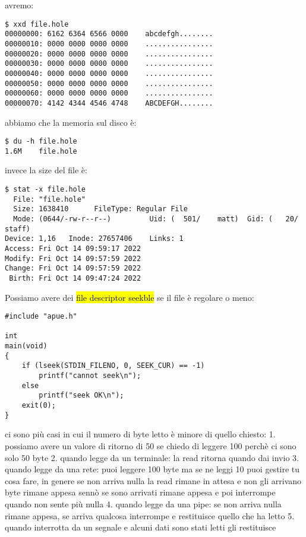 avremo:

\begin{lstlisting}
$ xxd file.hole
00000000: 6162 6364 6566 0000    abcdefgh........
00000010: 0000 0000 0000 0000    ................
00000020: 0000 0000 0000 0000    ................
00000030: 0000 0000 0000 0000    ................
00000040: 0000 0000 0000 0000    ................
00000050: 0000 0000 0000 0000    ................
00000060: 0000 0000 0000 0000    ................
00000070: 4142 4344 4546 4748    ABCDEFGH........
\end{lstlisting}

abbiamo che la memoria sul disco è:

\begin{lstlisting}
$ du -h file.hole 
1.6M	file.hole
\end{lstlisting}

invece la size del file è:

\begin{lstlisting}
$ stat -x file.hole 
  File: "file.hole"
  Size: 1638410      FileType: Regular File
  Mode: (0644/-rw-r--r--)         Uid: (  501/    matt)  Gid: (   20/   staff)
Device: 1,16   Inode: 27657406    Links: 1
Access: Fri Oct 14 09:59:17 2022
Modify: Fri Oct 14 09:57:59 2022
Change: Fri Oct 14 09:57:59 2022
 Birth: Fri Oct 14 09:47:24 2022
\end{lstlisting}

Possiamo avere dei \hl{file descriptor seekble} se il file è regolare o meno:

\begin{lstlisting}
#include "apue.h"

int
main(void)
{
	if (lseek(STDIN_FILENO, 0, SEEK_CUR) == -1)
		printf("cannot seek\n");
	else
		printf("seek OK\n");
	exit(0);
}
\end{lstlisting}






ci sono più casi in cui il numero di byte letto è minore di quello chiesto:
1. possiamo avere un valore di ritorno di 50 se chiedo di leggere 100 perchè ci sono solo 50 byte
2. quando legge da un terminale: la read ritorna quando dai invio
3. quando legge da una rete: puoi leggere 100 byte ma se ne leggi 10 puoi gestire tu cosa fare, in genere se non arriva nulla la read rimane in attesa e non gli arrivano byte rimane appesa sennò se sono arrivati rimane appesa e poi interrompe quando non sente più nulla
4. quando legge da una pipe: se non arriva nulla rimane appesa, se arriva qualcosa interrompe e restituisce quello che ha letto
5. quando interrotta da un segnale e alcuni dati sono stati letti gli restituisce
